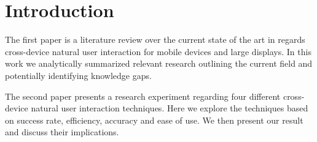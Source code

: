 \section*{Introduction}

The first paper is a literature review over the current state of the art in regards cross-device natural user interaction for mobile devices and large displays. In this work we analytically summarized relevant research outlining the current field and potentially identifying knowledge gaps. 

The second paper presents a research experiment regarding four different cross-device natural user interaction techniques. Here we explore the techniques based on success rate, efficiency, accuracy and ease of use. We then present our result and discuss their implications.